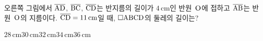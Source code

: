 \noindent\begin{minipage}[t]{0.58\linewidth}\vspace{0pt}\raggedright 오른쪽 그림에서 $\overline{\mathrm{AD}}$, $\overline{\mathrm{BC}}$, $\overline{\mathrm{CD}}$는 반지름의 길이가 $4\,\mathrm{cm}$인 반원~$\mathrm{O}$에 접하고 $\overline{\mathrm{AB}}$는 반원~$\mathrm{O}$의 지름이다. $\overline{\mathrm{CD}}=11\,\mathrm{cm}$일 때, $\square\mathrm{ABCD}$의 둘레의 길이는?\end{minipage}\hfill\begin{minipage}[t]{0.4\linewidth}\vspace{0pt}\centering \resizebox{\ifdim\width>\linewidth\linewidth\else\width\fi}{!}{}\end{minipage}\par
\begin{choices32}{$28\,\mathrm{cm}$}{$30\,\mathrm{cm}$}{$32\,\mathrm{cm}$}{$34\,\mathrm{cm}$}{$36\,\mathrm{cm}$}\end{choices32}
